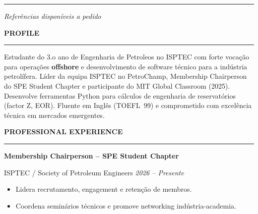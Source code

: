 \documentclass[10pt,a4paper]{article}
\renewcommand{\textbf}[1]{{\bfseries\color{cvgold}#1}}
\newcommand{\mainSection}[1]{%
  \vspace{1pt}%
  {\bfseries\color{cvgold}\large\MakeUppercase{#1}}%
  \par\vspace{0pt}%
  {\color{cvgold}\rule{\linewidth}{0.9pt}}%
  \par\vspace{1pt}%
}
\newcommand{\expEntry}[3]{%
  {\bfseries\color{cvgold}\normalsize #1}\par\vspace{1pt}%
  {\color{cvmuted}\small #2 \hfill \textit{\color{cvgoldlt}#3}}\par\vspace{1pt}%
}
\begin{document}
\begin{minipage}[t]{0.283\paperwidth}
\begin{minipage}[t]{\dimexpr\linewidth-18pt}
    \vspace{2pt}
    \begin{center}
      {\color{cvgold}\rule{0.55\linewidth}{0.4pt}}\par\vspace{2pt}
      {\color{cvgoldlt}\small\itshape Referências disponíveis a pedido}
    \end{center}

  \end{minipage}
\end{minipage}%
%
\hspace*{10pt}%
\begin{minipage}[t]{\dimexpr 0.705\paperwidth - 26pt}
  \color{cvwhite}
  \setlength{\parskip}{1pt}

  \vspace{5pt}


  \mainSection{Profile}
  Estudante do 3.o ano de Engenharia de Petroleos no ISPTEC com forte vocação para
  operações \textbf{offshore} e desenvolvimento de software técnico para a indústria
  petrolífera. Líder da equipa ISPTEC no PetroChamp, Membership Chairperson do SPE
  Student Chapter e participante do MIT Global Classroom (2025). Desenvolve ferramentas
  Python para cálculos de engenharia de reservatórios (factor Z, EOR). Fluente em
  Inglês (TOEFL~99) e comprometido com excelência técnica em mercados emergentes.

  \mainSection{Professional Experience}

  \expEntry{Membership Chairperson -- SPE Student Chapter}%
           {ISPTEC / Society of Petroleum Engineers}%
           {2026 – Presente}
  \begin{itemize}
    \item Lidera recrutamento, engagement e retenção de membros.
    \item Coordena seminários técnicos e promove networking indústria-academia.
  \end{itemize}


\end{minipage}
\end{document}
